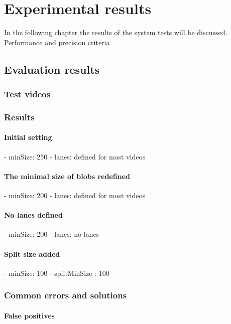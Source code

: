 \chapter{Experimental results}\label{chap:Tests}
In the following chapter the results of the system tests will be discussed. 
Performance and precision criteria 
\section{Evaluation results}
\subsection{Test videos}


\subsection{Results}
\subsubsection{Initial setting}
- minSize: 250
- lanes: defined for most videos

\subsubsection{The minimal size of blobs redefined}
- minSize: 200
- lanes: defined for most videos

\subsubsection{No lanes defined}
- minSize: 200
- lanes: no lanes

\subsubsection{Split size added}
- minSize: 100
- splitMinSize : 100

\subsection{Common errors and solutions}
\subsubsection{False positives}
